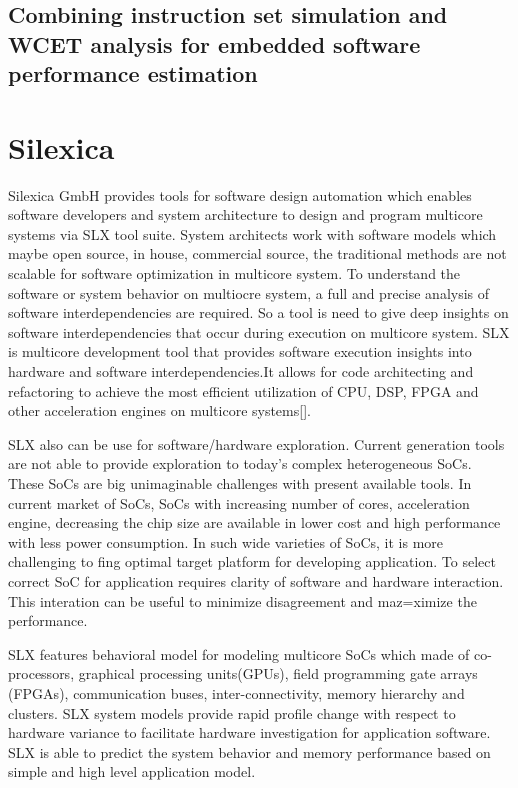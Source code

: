 \subsection{Combining instruction set simulation and WCET analysis for embedded software performance estimation}

\section{Silexica}
Silexica GmbH provides tools for software design automation which enables software developers and system architecture to design and program multicore systems via SLX tool suite. System architects work with software models which maybe open source, in house, commercial source, the traditional methods are not scalable for software optimization in multicore system. To understand the software or system behavior on multiocre system, a full and precise analysis of software interdependencies are required. So a tool is need to give deep insights on software interdependencies that occur during execution on multicore system. SLX is multicore development tool that provides software execution insights into hardware and software interdependencies.It allows for code architecting and refactoring to achieve the most efficient utilization of CPU, DSP, FPGA and other acceleration engines on multicore systems[].

\par SLX also can be use for software/hardware exploration. Current generation tools are not able to provide exploration to today's complex heterogeneous SoCs. These SoCs are big unimaginable challenges with present available tools. In current market of SoCs, SoCs with increasing number of cores, acceleration engine, decreasing the chip size are available in lower cost and high performance with less power consumption. In such wide varieties of SoCs, it is more challenging to fing optimal target platform for developing application. To select correct SoC for application requires clarity of software and hardware interaction. This interation can be useful to minimize disagreement and maz=ximize the performance. 

\par SLX features behavioral model for modeling multicore SoCs which made of co-processors, graphical processing units(GPUs), field programming gate arrays (FPGAs), communication buses, inter-connectivity, memory hierarchy and clusters. SLX system models provide rapid profile change with respect to hardware variance to facilitate hardware investigation for application software. SLX is able to predict the system behavior and memory performance based on simple and high level application model.

